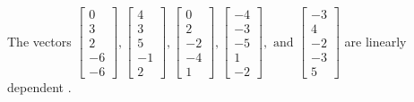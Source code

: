 \begin{exercise}
\begin{exerciseStatement}
  \end{exerciseStatement}
  \begin{exerciseAnswer}
   The vectors \(\left[\begin{array}{r}
0 \\
3 \\
2 \\
-6 \\
-6
\end{array}\right] , \left[\begin{array}{r}
4 \\
3 \\
5 \\
-1 \\
2
\end{array}\right] , \left[\begin{array}{r}
0 \\
2 \\
-2 \\
-4 \\
1
\end{array}\right] , \left[\begin{array}{r}
-4 \\
-3 \\
-5 \\
1 \\
-2
\end{array}\right] , \text{ and } \left[\begin{array}{r}
-3 \\
4 \\
-2 \\
-3 \\
5
\end{array}\right]\) are 
  	 linearly dependent  .
  


  \end{exerciseAnswer}
\end{exercise}